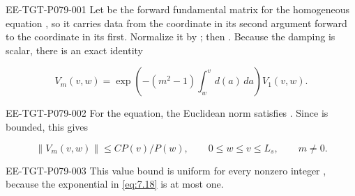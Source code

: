 %
\begin{EESegment}{EE-TGT-P079-001}
Let  be the forward fundamental matrix for the homogeneous equation , so it carries data from the coordinate in its second argument forward to the coordinate in its first. Normalize it by ; then . Because the damping is scalar, there is an exact identity
\end{EESegment}
\begin{equation}
  V_m(v,w)=\exp\!\left(-(m^2-1)\int_w^v d(a)\,da\right)V_1(v,w).
  \tag{7.18}\label{eq:7.18}
\end{equation}
\begin{EESegment}{EE-TGT-P079-002}
For the  equation, the Euclidean norm satisfies . Since  is bounded, this gives
\end{EESegment}
\begin{equation}
  \lVert V_m(v,w)\rVert\leq C P(v)/P(w),
  \qquad 0\leq w\leq v\leq L_s,\qquad m\neq0.
  \tag{7.19}\label{eq:7.19}
\end{equation}
\begin{EESegment}{EE-TGT-P079-003}
This value bound is uniform for every nonzero integer , because the exponential in \eqref{eq:7.18} is at most one.
\end{EESegment}

